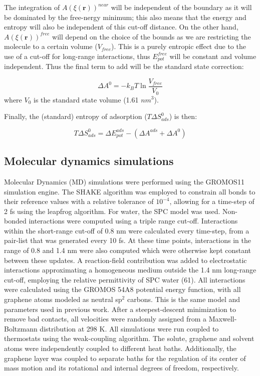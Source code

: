 \documentclass[journal=jcisd8,manuscript=article,layout=twocolumn]{achemso}
\begin{document}
The integration of $A(\xi(\mathbf{r}))^{near}$ will be independent of the boundary as it will be dominated by the free-nergy minimum; this also means that the energy and entropy will also be independent of this cut-off distance. On the other hand, $A(\xi(\mathbf{r}))^{free}$ will depend on the choice of the bounds  as we are restricting the molecule to a certain volume ($V_{free}$). This is a purely entropic effect  due to the use of a cut-off for long-range interactions, thus $E_{pot}^{free}$ will be constant and volume independent. Thus the final term to add will be the standard state correction:

\begin{equation}
\label{eq:Standard}
\Delta A^{0} =-k_BT \ln \frac{V_{free}}{V_{0}}
\end{equation}
%
where $V_0$ is the standard state volume (1.61
 $nm^3$).

Finally, the (standard) entropy of adsorption  ($T\Delta S_{ads}^0$) is then:

\begin{equation}
\label{eq:Entropy}
T\Delta S_{ads}^0 = \Delta E^{ads}_{pot}-(\Delta A^{ads} +\Delta A^{0})
\end{equation}

\subsection{Molecular dynamics simulations}

Molecular Dynamics (MD) simulations were performed using the GROMOS11 simulation engine.\cite{Riniker_2011,Schmid_2012}
The SHAKE algorithm \cite{Ryckaert_1977} was employed to constrain all bonds to their reference values with a relative tolerance of $10^{-4}$, allowing for a time-step of 2 fs using the leapfrog algorithm.\cite{Hockney_1977}
For water, the SPC model was used.\cite{Berendsen_1981}
Non-bonded interactions were computed using a triple range cut-off.
Interactions within the short-range cut-off of 0.8 nm were calculated every time-step, from a pair-list that was generated every 10 fs.  At these time points, interactions in the range of 0.8 and 1.4 nm were also computed which were otherwise kept constant between these updates.
A reaction-field contribution was added to electrostatic interactions approximating a homogeneous medium outside the 1.4 nm long-range cut-off, employing the relative
permittivity of SPC water (61).\cite{Tironi_1995}
All interactions were calculated using the GROMOS 54A8 potential energy function, with all graphene atoms modeled as neutral sp$^2$ carbons.\cite{Reif_2012}
This is the same model and parameters used in previous work.\cite{Escalona2022}
After a steepest-descent minimization to remove bad contacts, all velocities were randomly assigned from a Maxwell-Boltzmann distribution at 298 K.
All simulations were run coupled to thermostats using the weak-coupling algorithm.\cite{Berendsen_1984}
The solute, graphene and solvent atoms were independently coupled to different heat baths.
Additionally, the graphene layer was coupled to separate baths for the  regulation of its center of mass motion and its rotational and internal degrees of freedom, respectively.
\end{document}
